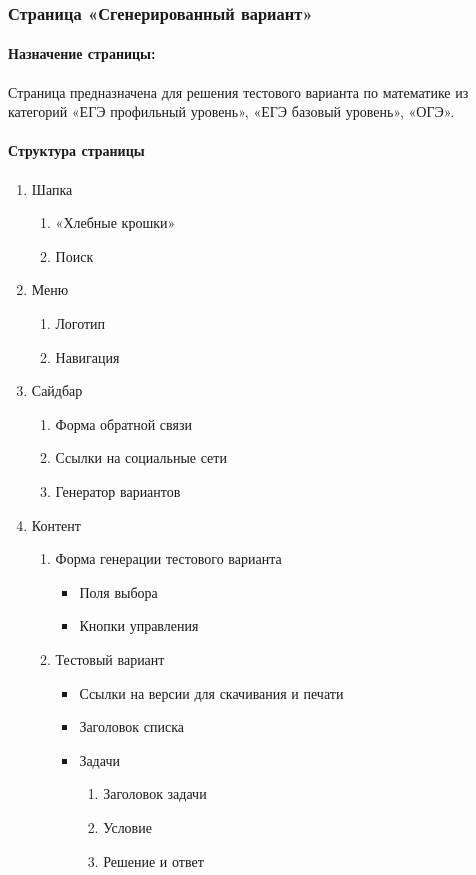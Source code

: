 \subsubsection{Страница «Сгенерированный вариант»}
\paragraph{Назначение страницы:} Страница предназначена для решения тестового варианта по математике из категорий «ЕГЭ профильный уровень», «ЕГЭ базовый уровень», «ОГЭ».

\paragraph{Структура страницы}
\begin{enumerate}
	\item Шапка
	\begin{enumerate}
		\item «Хлебные крошки»
		\item Поиск
	\end{enumerate}

	\item Меню
	\begin{enumerate}
		\item Логотип
		\item Навигация
	\end{enumerate}

	\item Сайдбар
	\begin{enumerate}
		\item Форма обратной связи
		\item Ссылки на социальные сети
		\item Генератор вариантов
	\end{enumerate}

	\item Контент
	\begin{enumerate}
		\item Форма генерации тестового варианта
		\begin{itemize}
		\item Поля выбора
		\item Кнопки управления
		\end{itemize}

		\item Тестовый вариант
		\begin{itemize}
		\item Ссылки на версии для скачивания и печати
		\item Заголовок списка
		\item Задачи
		\begin{enumerate}
			\item Заголовок задачи
			\item Условие
			\item Решение и ответ
		\end{enumerate}
		\end{itemize}
	\end{enumerate}


\end{enumerate}
